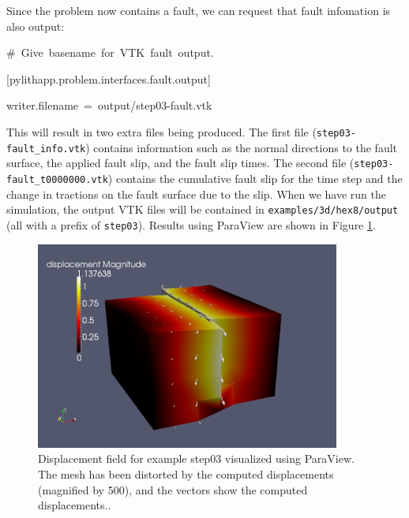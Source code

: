 Since the problem now contains a fault, we can request that fault
infomation is also output:
\begin{lyxcode}
\#~Give~basename~for~VTK~fault~output.

{[}pylithapp.problem.interfaces.fault.output{]}

writer.filename~=~output/step03-fault.vtk~
\end{lyxcode}
This will result in two extra files being produced. The first file
(\texttt{step03-fault\_info.vtk}) contains information such as the
normal directions to the fault surface, the applied fault slip, and
the fault slip times. The second file (\texttt{step03-fault\_t0000000.vtk})
contains the cumulative fault slip for the time step and the change
in tractions on the fault surface due to the slip. When we have run
the simulation, the output VTK files will be contained in \texttt{examples/3d/hex8/output}
(all with a prefix of \texttt{step03}). Results using ParaView are
shown in Figure \ref{fig:step03-displ}.
\begin{figure}
\centering{}\includegraphics[width=10cm]{tutorials/3dhex8/figs/step03-displ}\caption{Displacement field for example step03 visualized using ParaView. The
mesh has been distorted by the computed displacements (magnified by
500), and the vectors show the computed displacements.\label{fig:step03-displ}.}
\end{figure}

